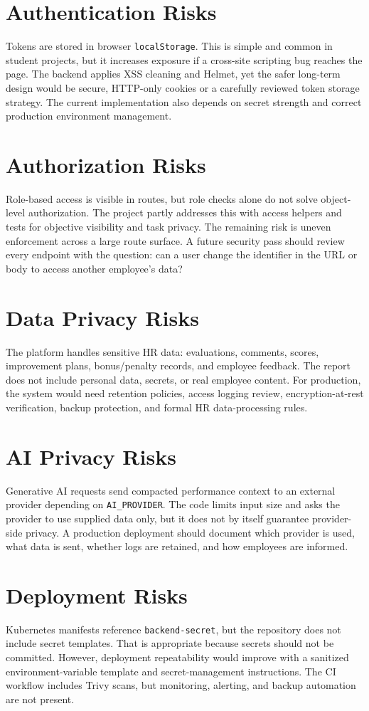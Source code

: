 \section{Authentication Risks}
Tokens are stored in browser \texttt{localStorage}. This is simple and common in student projects, but it increases exposure if a cross-site scripting bug reaches the page. The backend applies XSS cleaning and Helmet, yet the safer long-term design would be secure, HTTP-only cookies or a carefully reviewed token storage strategy. The current implementation also depends on secret strength and correct production environment management.

\section{Authorization Risks}
Role-based access is visible in routes, but role checks alone do not solve object-level authorization. The project partly addresses this with access helpers and tests for objective visibility and task privacy. The remaining risk is uneven enforcement across a large route surface. A future security pass should review every endpoint with the question: can a user change the identifier in the URL or body to access another employee's data?

\section{Data Privacy Risks}
The platform handles sensitive HR data: evaluations, comments, scores, improvement plans, bonus/penalty records, and employee feedback. The report does not include personal data, secrets, or real employee content. For production, the system would need retention policies, access logging review, encryption-at-rest verification, backup protection, and formal HR data-processing rules.

\section{AI Privacy Risks}
Generative AI requests send compacted performance context to an external provider depending on \texttt{AI\_PROVIDER}. The code limits input size and asks the provider to use supplied data only, but it does not by itself guarantee provider-side privacy. A production deployment should document which provider is used, what data is sent, whether logs are retained, and how employees are informed.

\section{Deployment Risks}
Kubernetes manifests reference \texttt{backend-secret}, but the repository does not include secret templates. That is appropriate because secrets should not be committed. However, deployment repeatability would improve with a sanitized environment-variable template and secret-management instructions. The CI workflow includes Trivy scans, but monitoring, alerting, and backup automation are not present.

